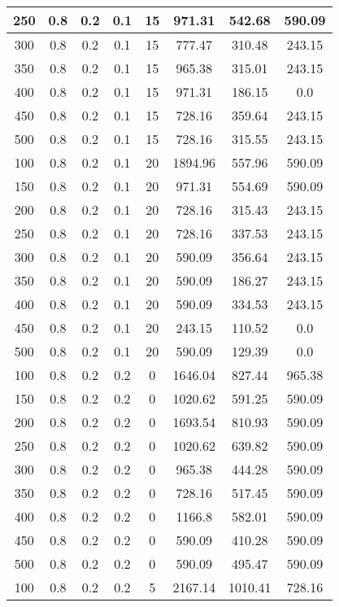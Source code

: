 \documentclass[a4paper, 12pt]{extreport}
\begin{document}
\begin{itemize}
\begin{longtable}{|c|c|c|c|c|c|c|c|}
			250 & 0.8 & 0.2 & 0.1 & 15 & 971.31 & 542.68 & 590.09 \\\hline
			300 & 0.8 & 0.2 & 0.1 & 15 & 777.47 & 310.48 & 243.15 \\\hline
			350 & 0.8 & 0.2 & 0.1 & 15 & 965.38 & 315.01 & 243.15 \\\hline
			400 & 0.8 & 0.2 & 0.1 & 15 & 971.31 & 186.15 & 0.0 \\\hline
			450 & 0.8 & 0.2 & 0.1 & 15 & 728.16 & 359.64 & 243.15 \\\hline
			500 & 0.8 & 0.2 & 0.1 & 15 & 728.16 & 315.55 & 243.15 \\\hline
			100 & 0.8 & 0.2 & 0.1 & 20 & 1894.96 & 557.96 & 590.09 \\\hline
			150 & 0.8 & 0.2 & 0.1 & 20 & 971.31 & 554.69 & 590.09 \\\hline
			200 & 0.8 & 0.2 & 0.1 & 20 & 728.16 & 315.43 & 243.15 \\\hline
			250 & 0.8 & 0.2 & 0.1 & 20 & 728.16 & 337.53 & 243.15 \\\hline
			300 & 0.8 & 0.2 & 0.1 & 20 & 590.09 & 356.64 & 243.15 \\\hline
			350 & 0.8 & 0.2 & 0.1 & 20 & 590.09 & 186.27 & 243.15 \\\hline
			400 & 0.8 & 0.2 & 0.1 & 20 & 590.09 & 334.53 & 243.15 \\\hline
			450 & 0.8 & 0.2 & 0.1 & 20 & 243.15 & 110.52 & 0.0 \\\hline
			500 & 0.8 & 0.2 & 0.1 & 20 & 590.09 & 129.39 & 0.0 \\\hline
			100 & 0.8 & 0.2 & 0.2 & 0 & 1646.04 & 827.44 & 965.38 \\\hline
			150 & 0.8 & 0.2 & 0.2 & 0 & 1020.62 & 591.25 & 590.09 \\\hline
			200 & 0.8 & 0.2 & 0.2 & 0 & 1693.54 & 810.93 & 590.09 \\\hline
			250 & 0.8 & 0.2 & 0.2 & 0 & 1020.62 & 639.82 & 590.09 \\\hline
			300 & 0.8 & 0.2 & 0.2 & 0 & 965.38 & 444.28 & 590.09 \\\hline
			350 & 0.8 & 0.2 & 0.2 & 0 & 728.16 & 517.45 & 590.09 \\\hline
			400 & 0.8 & 0.2 & 0.2 & 0 & 1166.8 & 582.01 & 590.09 \\\hline
			450 & 0.8 & 0.2 & 0.2 & 0 & 590.09 & 410.28 & 590.09 \\\hline
			500 & 0.8 & 0.2 & 0.2 & 0 & 590.09 & 495.47 & 590.09 \\\hline
			100 & 0.8 & 0.2 & 0.2 & 5 & 2167.14 & 1010.41 & 728.16 \\\hline

\end{longtable}
\end{itemize}
\end{document}
